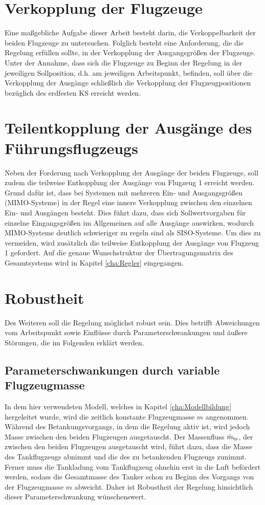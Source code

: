 \section{Verkopplung der Flugzeuge}
Eine maßgebliche Aufgabe dieser Arbeit besteht darin, die Verkoppelbarkeit der beiden Flugzeuge zu untersuchen. Folglich besteht eine Anforderung, die die Regelung erfüllen sollte, in der Verkopplung der Ausgangsgrößen der Flugzeuge. Unter der Annahme, dass sich die Flugzeuge zu Beginn der Regelung in der jeweiligen Sollposition, d.h. am jeweiligen Arbeitspunkt, befinden, soll über die Verkopplung der Ausgänge schließlich die Verkopplung der Flugzeugpositionen bezüglich des erdfesten KS erreicht werden. 

\section{Teilentkopplung der Ausgänge des Führungsflugzeugs} 
Neben der Forderung nach Verkopplung der Ausgänge der beiden Flugzeuge, soll zudem die teilweise Entkopplung der Ausgänge von Flugzeug 1 erreicht werden. Grund dafür ist, dass bei Systemen mit mehreren Ein- und Ausgangsgrößen (MIMO-Systeme) in der Regel eine innere Verkopplung zwischen den einzelnen Ein- und Ausgängen besteht. Dies führt dazu, dass sich Sollwertvorgaben für einzelne Eingangsgrößen im Allgemeinen auf alle Ausgänge auswirken, wodurch MIMO-Systeme deutlich schwieriger zu regeln sind als SISO-Systeme. Um dies zu vermeiden, wird zusätzlich die teilweise Entkopplung der Ausgänge von Flugzeug 1 gefordert. Auf die genaue Wunschstruktur der Übertragungsmatrix des Gesamtsystems wird in Kapitel \ref{cha:Regler} eingegangen.

\section{Robustheit}
Des Weiteren soll die Regelung möglichst robust sein. Dies betrifft Abweichungen vom Arbeitspunkt sowie Einflüsse durch Parameterschwankungen und äußere Störungen, die im Folgenden erklärt werden.

\subsection{Parameterschwankungen durch variable Flugzeugmasse}
In dem hier verwendeten Modell, welches in Kapitel \ref{cha:Modellbildung} hergeleitet wurde, wird die zeitlich konstante Flugzeugmasse $m$ angenommen. Während des Betankungsvorgangs, in dem die Regelung aktiv ist, wird jedoch Masse zwischen den beiden Flugzeugen ausgetauscht. Der Massenfluss $\dot{m}_{\mathrm{ts}}$, der zwischen den beiden Flugzeugen ausgetauscht wird, führt dazu, dass die Masse des Tankflugzeugs abnimmt und die des zu betankenden Flugzeugs zunimmt. Ferner muss die Tankladung vom Tankflugzeug ohnehin erst in die Luft befördert werden, sodass die Gesamtmasse des Tanker schon zu Beginn des Vorgangs von der Flugzeugmasse $m$ abweicht. Daher ist Robustheit der Regelung hinsichtlich dieser Parameterschwankung wünschenswert.


